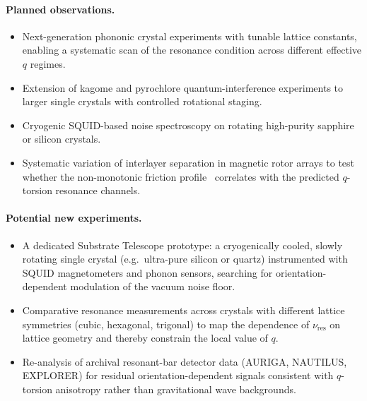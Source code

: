 \paragraph{Planned observations.}
\begin{itemize}
  \item Next-generation phononic crystal experiments with tunable lattice
        constants, enabling a systematic scan of the resonance condition
        across different effective $q$ regimes.
  \item Extension of kagome and pyrochlore quantum-interference experiments
        to larger single crystals with controlled rotational staging.
  \item Cryogenic SQUID-based noise spectroscopy on rotating high-purity
        sapphire or silicon crystals.
  \item Systematic variation of interlayer separation in magnetic rotor arrays
        to test whether the non-monotonic friction profile~\cite{gu2026}
        correlates with the predicted $q$-torsion resonance channels.
\end{itemize}

\paragraph{Potential new experiments.}
\begin{itemize}
  \item A dedicated Substrate Telescope prototype: a cryogenically cooled,
        slowly rotating single crystal (e.g.\ ultra-pure silicon or quartz)
        instrumented with SQUID magnetometers and phonon sensors, searching
        for orientation-dependent modulation of the vacuum noise floor.
  \item Comparative resonance measurements across crystals with different
        lattice symmetries (cubic, hexagonal, trigonal) to map the
        dependence of $\nu_{\mathrm{res}}$ on lattice geometry and thereby
        constrain the local value of $q$.
  \item Re-analysis of archival resonant-bar detector data (AURIGA,
        NAUTILUS, EXPLORER) for residual orientation-dependent signals
        consistent with $q$-torsion anisotropy rather than gravitational
        wave backgrounds.
\end{itemize}
